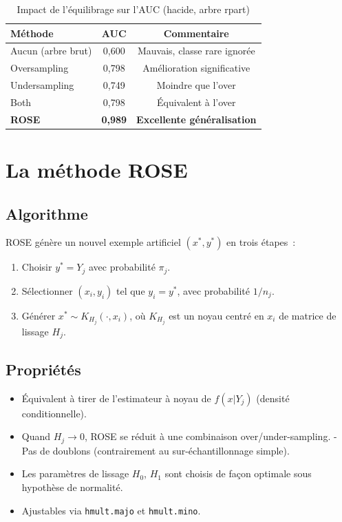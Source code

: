 \documentclass[a4paper,11pt]{article}
\theoremstyle{definition}
\begin{document}
\begin{table}[h]
\centering
\caption{Impact de l'\'equilibrage sur l'AUC (hacide, arbre rpart)}
\begin{tabular}{lcc}
\toprule
M\'ethode & AUC & Commentaire \\
\midrule
Aucun (arbre brut) & 0,600 & Mauvais, classe rare ignor\'ee \\
Oversampling & 0,798 & Am\'elioration significative \\
Undersampling & 0,749 & Moindre que l'over \\
Both & 0,798 & \'Equivalent \`a l'over \\
\textbf{ROSE} & \textbf{0,989} & \textbf{Excellente g\'en\'eralisation} \\
\bottomrule
\end{tabular}
\end{table}

\section{La m\'ethode ROSE}

\subsection{Algorithme}

ROSE g\'en\`ere un nouvel exemple artificiel $(x^*, y^*)$ en trois
\'etapes~:

\begin{enumerate}
  \item Choisir $y^* = Y_j$ avec probabilit\'e $\pi_j$.
  \item S\'electionner $(x_i, y_i)$ tel que $y_i = y^*$,
    avec probabilit\'e $1/n_j$.
  \item G\'en\'erer $x^* \sim K_{H_j}(\cdot, x_i)$, o\`u $K_{H_j}$
    est un noyau centr\'e en $x_i$ de matrice de lissage $H_j$.
\end{enumerate}

\subsection{Propri\'et\'es}

\begin{itemize}
  \item \'Equivalent \`a tirer de l'estimateur \`a noyau de
    $f(x|Y_j)$ (densit\'e conditionnelle).
  \item Quand $H_j \to 0$, ROSE se r\'eduit \`a une combinaison
    over/under-sampling.
  - Pas de doublons (contrairement au sur-\'echantillonnage simple).
  \item Les param\`etres de lissage $H_0$, $H_1$ sont choisis de
    fa\c con optimale sous hypoth\`ese de normalit\'e.
  \item Ajustables via \texttt{hmult.majo} et \texttt{hmult.mino}.
\end{itemize}
\end{document}
